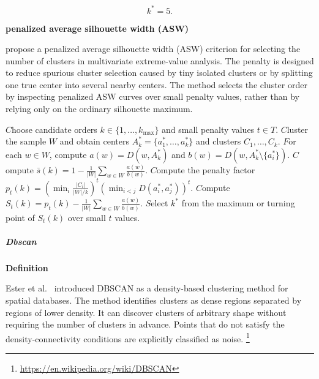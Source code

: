 \documentclass{book}
\providecommand{\ProjectDeepHeading}[2]{%
    \par\medskip\noindent\textbf{#2}\par\smallskip
}
\providecommand{\seeherefooter}[1]{\footnote{\url{#1}}}
\providecommand{\State}[1]{\ensuremath{#1}}
\begin{document}
        \[
            k^{\ast} = 5.
        \]
        
        \ProjectDeepHeading{3}{penalized average silhouette width (ASW)}
            \cite{deng-2024-on-estimation-and-order-selection-for-multivariate-extremes-via-clustering} propose a penalized average silhouette width (ASW) criterion for selecting the number of clusters in multivariate extreme-value analysis.
            The penalty is designed to reduce spurious cluster selection caused by tiny isolated clusters or by splitting one true center into several nearby centers.
            The method selects the cluster order by inspecting penalized ASW curves over small penalty values, rather than by relying only on the ordinary silhouette maximum.
            \begin{algorithm}[H]
            \caption{Penalized ASW Order Selection}
            \begin{algorithmic}[1]
                \State Choose candidate orders \(k \in \{1,\dots,k_{\max}\}\) and small penalty values \(t \in T\).
                    \State Cluster the sample \(W\) and obtain centers \(A_k^\ast=\{a_1^\ast,\dots,a_k^\ast\}\) and clusters \(C_1,\dots,C_k\).
                    \State For each \(w \in W\), compute \(a(w)=D(w,A_k^\ast)\) and \(b(w)=D(w,A_k^\ast \setminus \{a_i^\ast\})\).
                    \State Compute \(\bar{s}(k)=1-\frac{1}{|W|}\sum_{w\in W}\frac{a(w)}{b(w)}\).
                    \State Compute the penalty factor \(p_t(k)=\left(\min_i \frac{|C_i|}{|W|/k}\right)^t\left(\min_{i<j}D(a_i^\ast,a_j^\ast)\right)^t\).
                    \State Compute \(S_t(k)=p_t(k)-\frac{1}{|W|}\sum_{w\in W}\frac{a(w)}{b(w)}\).
                \EndFor
                \State Select \(k^\ast\) from the maximum or turning point of \(S_t(k)\) over small \(t\) values.
            \end{algorithmic}
            \end{algorithm}

\subparagraph{Dbscan}


\ProjectDeepHeading{3}{Definition}

      Ester et al.~\cite{ester-1996-a-density-based-algorithm-for-discovering-clusters-in-large-spatial-databases-with-noise} introduced DBSCAN as a density-based clustering method for spatial databases. The method identifies clusters as dense regions separated by regions of lower density. It can discover clusters of arbitrary shape without requiring the number of clusters in  advance. Points that do not satisfy the density-connectivity conditions are explicitly classified as noise.
      \seeherefooter{https://en.wikipedia.org/wiki/DBSCAN}
\end{document}
